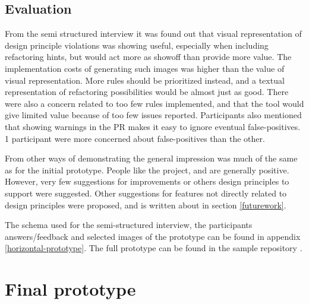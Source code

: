 \documentclass{report}
\begin{document}
\subsection*{Evaluation}
From the semi structured interview it was found out that visual representation of design principle violations was showing useful, especially when including refactoring hints, but would act more as showoff than provide more value. The implementation costs of generating such images was higher than the value of visual representation. More rules should be prioritized instead, and a textual representation of refactoring possibilities would be almost just as good. There were also a concern related to too few rules implemented, and that the tool would give limited value because of too few issues reported. Participants also mentioned that showing warnings in the PR makes it easy to ignore eventual false-positives. 1 participant were more concerned about false-positives than the other.



From other ways of demonstrating the general impression was much of the same as for the initial prototype. People like the project, and are generally positive. However, very few suggestions for improvements or others design principles to support were suggested. Other suggestions for features not directly related to design principles were proposed, and is written about in section \ref{futurework}.

The schema used for the semi-structured interview, the participants answers/feedback and selected images of the prototype can be found in appendix \ref{horizontal-prototype}. The full prototype can be found in the sample repository \cite{sample-repository}. 



\section{Final prototype}
\end{document}
